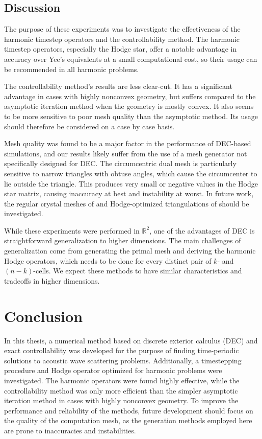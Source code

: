 \documentclass[utf8,english]{gradu3}
\begin{document}
\section{Discussion}

The purpose of these experiments was to investigate
the effectiveness of the harmonic time\-step operators
and the controllability method.
The harmonic timestep operators, especially the Hodge star,
offer a notable advantage in accuracy
over Yee's equivalents at a small computational cost,
so their usage can be recommended in all harmonic problems.

The controllability method's results are less clear-cut.
It has a significant advantage in cases with highly nonconvex geometry,
but suffers compared to the asymptotic iteration method
when the geometry is mostly convex.
It also seems to be more sensitive to poor mesh quality
than the asymptotic method.
Its usage should therefore be considered on a case by case basis.

Mesh quality was found to be a major factor in the performance of DEC-based simulations,
and our results likely suffer from the use of a mesh generator
not specifically designed for DEC.
The circumcentric dual mesh is particularly sensitive to narrow triangles
with obtuse angles, which cause the circumcenter to lie outside the triangle.
This produces very small or negative values
in the Hodge star matrix, causing inaccuracy at best and instability at worst.
In future work, the regular crystal meshes of \textcite{rabina_numerical_2014}
and Hodge-optimized triangulations of \textcite{mullen_hot_2011} should be investigated.

While these experiments were performed in $\mathbb{R}^2$,
one of the advantages of DEC is straightforward generalization to higher dimensions.
The main challenges of generalization come from generating the primal mesh
and deriving the harmonic Hodge operators, which needs to be done
for every distinct pair of $k$- and $(n-k)$-cells.
We expect these methods to have similar characteristics and tradeoffs
in higher dimensions.


\chapter{Conclusion}

In this thesis, a numerical method based on discrete exterior calculus (DEC)
and exact controllability was developed
for the purpose of finding time-periodic solutions to acoustic wave scattering problems.
Additionally, a timestepping procedure
and Hodge operator optimized for harmonic problems were investigated.
The harmonic operators were found highly effective,
while the controllability method was only more efficient
than the simpler asymptotic iteration method
in cases with highly nonconvex geometry.
To improve the performance and reliability of the methods,
future development should focus on the quality of the computation mesh,
as the generation methods employed here
are prone to inaccuracies and instabilities.


\hfuzz=15pt
\printbibliography
\hfuzz=0pt
\end{document}
